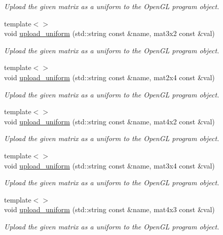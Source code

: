 \begin{DoxyCompactItemize}
\begin{DoxyCompactList}\small\item\em Upload the given matrix as a uniform to the Open\-G\-L program object. \end{DoxyCompactList}\item 
{\footnotesize template$<$$>$ }\\void \hyperlink{classgfx_1_1program_a25f7022878c1a7275bd987cad9ef4125}{upload\-\_\-uniform} (std\-::string const \&name, mat3x2 const \&val)
\begin{DoxyCompactList}\small\item\em Upload the given matrix as a uniform to the Open\-G\-L program object. \end{DoxyCompactList}\item 
{\footnotesize template$<$$>$ }\\void \hyperlink{classgfx_1_1program_a774c92ec452df3b506a89e57dfc25817}{upload\-\_\-uniform} (std\-::string const \&name, mat2x4 const \&val)
\begin{DoxyCompactList}\small\item\em Upload the given matrix as a uniform to the Open\-G\-L program object. \end{DoxyCompactList}\item 
{\footnotesize template$<$$>$ }\\void \hyperlink{classgfx_1_1program_ab29062dd8cda16e71ccdf5ca9ab1d8c4}{upload\-\_\-uniform} (std\-::string const \&name, mat4x2 const \&val)
\begin{DoxyCompactList}\small\item\em Upload the given matrix as a uniform to the Open\-G\-L program object. \end{DoxyCompactList}\item 
{\footnotesize template$<$$>$ }\\void \hyperlink{classgfx_1_1program_a93badfcb29591dabf389da9b1424cce8}{upload\-\_\-uniform} (std\-::string const \&name, mat3x4 const \&val)
\begin{DoxyCompactList}\small\item\em Upload the given matrix as a uniform to the Open\-G\-L program object. \end{DoxyCompactList}\item 
{\footnotesize template$<$$>$ }\\void \hyperlink{classgfx_1_1program_ae2edae1dba53f0b28e70664298cc0550}{upload\-\_\-uniform} (std\-::string const \&name, mat4x3 const \&val)
\begin{DoxyCompactList}\small\item\em Upload the given matrix as a uniform to the Open\-G\-L program object. \end{DoxyCompactList}\end{DoxyCompactItemize}

